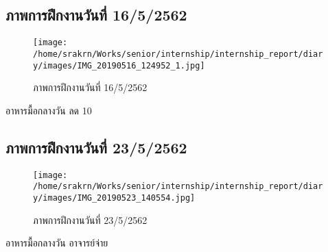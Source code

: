 
\subsection*{ภาพการฝึกงานวันที่ 16/5/2562}
\begin{figure}[h]
    \centering
    \texttt{[image: /home/srakrn/Works/senior/internship/internship\_report/diary/images/IMG\_20190516\_124952\_1.jpg]}
    \caption{ภาพการฝึกงานวันที่ 16/5/2562}
\end{figure}

อาหารมื้อกลางวัน ลด 10%

\subsection*{ภาพการฝึกงานวันที่ 23/5/2562}
\begin{figure}[h]
    \centering
    \texttt{[image: /home/srakrn/Works/senior/internship/internship\_report/diary/images/IMG\_20190523\_140554.jpg]}
    \caption{ภาพการฝึกงานวันที่ 23/5/2562}
\end{figure}

อาหารมื้อกลางวัน อาจารย์จ่าย
